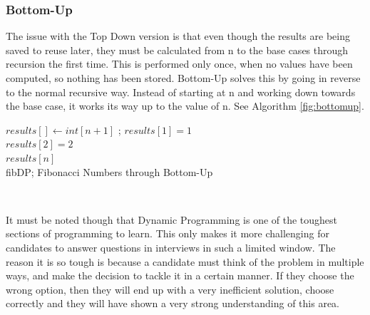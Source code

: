 \documentclass[10pt,twocolumn,hidelinks]{IEEEtran}
\begin{document}
	\subsubsection{Bottom-Up}
	The issue with the Top Down version is that even though the results are being saved to reuse later, they must be calculated from n to the base cases through recursion the first time. This is performed only once, when no values have been computed, so nothing has been stored.
	Bottom-Up solves this by going in reverse to the normal recursive way. Instead of starting at n and working down towards the base case, it works its way up to the value of n. See Algorithm \ref{fig:bottomup}.
\IncMargin{1em}
	\begin{algorithm}
	\LinesNumbered
		$results[] \leftarrow int[n+1]$ ; $results[1] = 1$ \\ $results[2] = 2$ \\
		\Return $results[n]$\\		
		\caption{fibDP; Fibonacci Numbers through Bottom-Up}
		\label{fig:bottomup}
	\end{algorithm}\DecMargin{1em}
	\\
\par It must be noted though that Dynamic Programming is one of the toughest sections of programming to learn. This only makes it more challenging for candidates to answer questions in interviews in such a limited window. The reason it is so tough is because a candidate must think of the problem in multiple ways, and make the decision to tackle it in a certain manner. If they choose the wrong option, then they will end up with a very inefficient solution, choose correctly and they will have shown a very strong understanding of this area.
\end{document}
